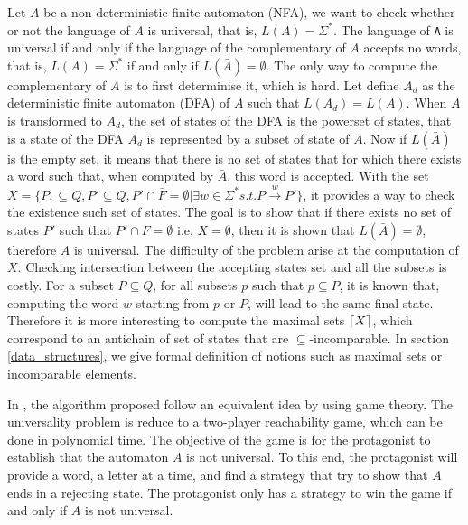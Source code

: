 \documentclass[letterpaper]{article}
\DeclarePairedDelimiter{\ceil}{\lceil}{\rceil}
\theoremstyle{definition}
\begin{document}
Let $A$ be a non-deterministic finite automaton (NFA),
we want to check whether or not
the language of $A$ is universal, that is, $L(A) = \Sigma^*$.
The language of \texttt{A} is universal if and only if the language
of the complementary of $A$ accepts no words, that is,
$L(A) = \Sigma^*$ if and only if $L(\bar{A}) = \emptyset$.
The only way to compute the complementary of $A$ is to first
determinise it, which is hard. Let define $A_d$ as the deterministic finite
automaton (DFA) of $A$ such that $L(A_d) = L(A)$.
When $A$ is transformed to $A_d$,
the set of states of the DFA is the powerset of states,
that is a state of the DFA $A_d$ is represented by a subset of state of $A$.
Now if $L(\bar{A})$ is the empty set,
it means that there is no set of states that for which there exists a word
such that, when computed by $\bar{A}$,
this word is accepted.
With the set
$X = \{ P,  \subseteq Q, P' \subseteq Q, P' \cap \bar{F} = \emptyset
| \exists w \in \Sigma^* s.t. P \xrightarrow{w} P'\}$, it provides
a way to check the existence such set of states.
The goal is to show that if there exists
no set of states $P'$ such that $P' \cap F = \emptyset$ i.e.
$X = \emptyset$, then it is shown that $L(\bar{A}) = \emptyset$, therefore
$A$ is universal. The difficulty of the problem arise at the computation
of $X$. Checking intersection between the accepting states set and all
the subsets is costly.
For a subset $P \subseteq Q$, for all subsets $p$ such that $p \subseteq P$,
it is known that, computing the word $w$ starting from $p$ or $P$, will lead
to the same final state. Therefore it is more interesting to compute
the maximal sets $\ceil{X}$, which correspond to an antichain of set of
states that are $\subseteq$-incomparable. In section \ref{data_structures},
we give formal definition of notions such as maximal sets or incomparable
elements.


In
\cite{AC_universality}, the algorithm proposed follow an equivalent
idea by using game theory. The universality problem is reduce to
a two-player reachability game, which can be done in polynomial time.
The objective of the game is for the protagonist to establish that
the automaton $A$ is not universal. To this end, the protagonist will
provide a word, a letter at a time, and find a strategy that try
to show that $A$ ends in a rejecting state.
The protagonist only has a strategy to win the game if and only if $A$ is
not universal.

\end{document}
